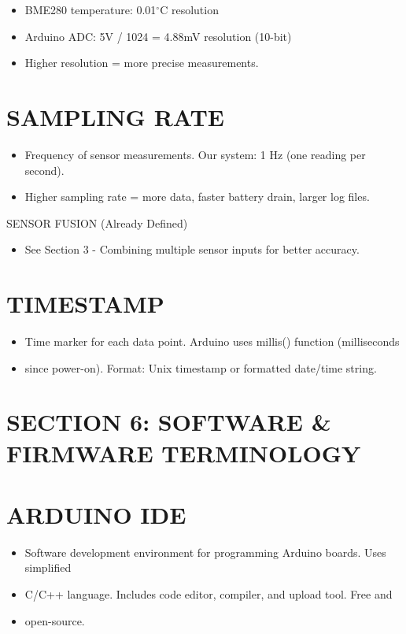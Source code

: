 \documentclass[11pt,letterpaper]{article}
\begin{document}
\begin{itemize}
  \item BME280 temperature: 0.01$^\circ$C resolution
  \item Arduino ADC: 5V / 1024 = 4.88mV resolution (10-bit)
  \item Higher resolution = more precise measurements.
\end{itemize}

\section{SAMPLING RATE}

\begin{itemize}
  \item Frequency of sensor measurements. Our system: 1 Hz (one reading per second).
  \item Higher sampling rate = more data, faster battery drain, larger log files.
\end{itemize}

SENSOR FUSION (Already Defined)\par

\begin{itemize}
  \item See Section 3 - Combining multiple sensor inputs for better accuracy.
\end{itemize}

\section{TIMESTAMP}

\begin{itemize}
  \item Time marker for each data point. Arduino uses millis() function (milliseconds
  \item since power-on). Format: Unix timestamp or formatted date/time string.
\end{itemize}

\section{SECTION 6: SOFTWARE \& FIRMWARE TERMINOLOGY}

\section{ARDUINO IDE}

\begin{itemize}
  \item Software development environment for programming Arduino boards. Uses simplified
  \item C/C++ language. Includes code editor, compiler, and upload tool. Free and
  \item open-source.
\end{itemize}
\end{document}
